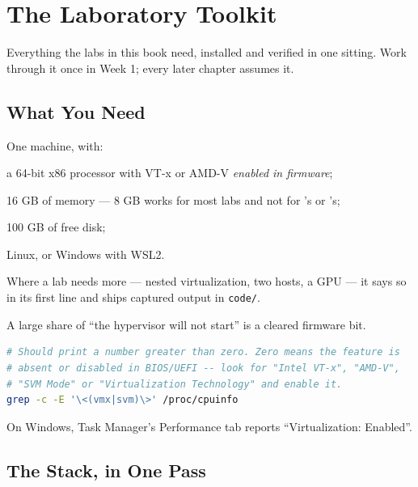 \chapter{The Laboratory Toolkit}\label{app:toolkit}
\normalfigures

Everything the labs in this book need, installed and verified in one sitting.
Work through it once in Week 1; every later chapter assumes it.

\section{What You Need}

One machine, with:

\begin{tight}
  \item a 64-bit x86 processor with VT-x or AMD-V \emph{enabled in firmware};
  \item 16 GB of memory --- 8 GB works for most labs and not for
        's or 's;
  \item 100 GB of free disk;
  \item Linux, or Windows with WSL2.
\end{tight}

Where a lab needs more --- nested virtualization, two hosts, a GPU --- it says
so in its first line and ships captured output in \texttt{code/}.

\begin{alertbox}
A large share of ``the hypervisor will not start'' is a cleared firmware bit.
\begin{lstlisting}[language=bash]
# Should print a number greater than zero. Zero means the feature is
# absent or disabled in BIOS/UEFI -- look for "Intel VT-x", "AMD-V",
# "SVM Mode" or "Virtualization Technology" and enable it.
grep -c -E '\<(vmx|svm)\>' /proc/cpuinfo
\end{lstlisting}
On Windows, Task Manager's Performance tab reports ``Virtualization:
Enabled''.
\end{alertbox}

\section{The Stack, in One Pass}

